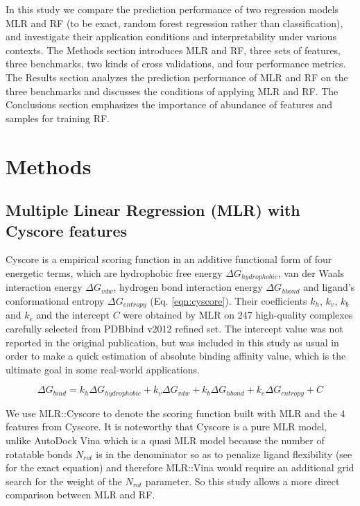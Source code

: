 \documentclass[linenumbers]{bmcart}
\begin{document}
In this study we compare the prediction performance of two regression models MLR and RF (to be exact, random forest regression rather than classification), and investigate their application conditions and interpretability under various contexts. The Methods section introduces MLR and RF, three sets of features, three benchmarks, two kinds of cross validations, and four performance metrics. The Results section analyzes the prediction performance of MLR and RF on the three benchmarks and discusses the conditions of applying MLR and RF. The Conclusions section emphasizes the importance of abundance of features and samples for training RF.

\section*{Methods}

\subsection*{Multiple Linear Regression (MLR) with Cyscore features}

Cyscore is a empirical scoring function in an additive functional form of four energetic terms, which are hydrophobic free energy $\Delta G_{hydrophobic}$, van der Waals interaction energy $\Delta G_{vdw}$, hydrogen bond interaction energy $\Delta G_{hbond}$ and ligand's conformational entropy $\Delta G_{entropy}$ (Eq. \ref{eqn:cyscore}). Their coefficients $k_h$, $k_v$, $k_b$ and $k_e$ and the intercept $C$ were obtained by MLR on 247 high-quality complexes carefully selected from PDBbind v2012 refined set. The intercept value was not reported in the original publication, but was included in this study as usual \cite{1313} in order to make a quick estimation of absolute binding affinity value, which is the ultimate goal in some real-world applications.

\begin{equation}
\Delta G_{bind} = k_h\Delta G_{hydrophobic} + k_v\Delta G_{vdw} + k_b\Delta G_{hbond} + k_e\Delta G_{entropy} + C
\label{eqn:cyscore}
\end{equation}

We use MLR::Cyscore to denote the scoring function built with MLR and the 4 features from Cyscore. It is noteworthy that Cyscore is a pure MLR model, unlike AutoDock Vina \cite{595} which is a quasi MLR model because the number of rotatable bonds $N_{rot}$ is in the denominator so as to penalize ligand flexibility (see \cite{1362} for the exact equation) and therefore MLR::Vina would require an additional grid search for the weight of the $N_{rot}$ parameter. So this study allows a more direct comparison between MLR and RF.
\end{document}
